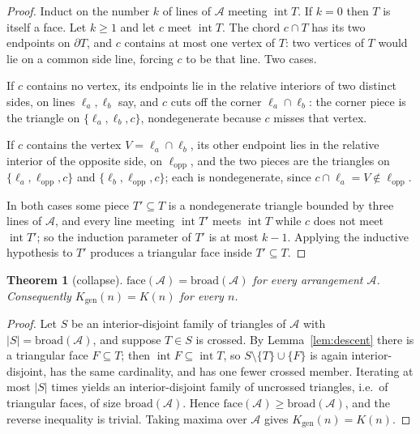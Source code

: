 \documentclass[11pt]{article}
\newtheorem{theorem}{Theorem}
\theoremstyle{definition}
\newcommand{\Kgen}{K_{\mathrm{gen}}}
\newcommand{\intr}{\operatorname{int}}
\begin{document}
\begin{proof}
Induct on the number $k$ of lines of $\mathcal A$ meeting $\intr T$. If
$k=0$ then $T$ is itself a face. Let $k\ge1$ and let $c$ meet $\intr T$.
The chord $c\cap T$ has its two endpoints on $\partial T$, and $c$ contains
at most one vertex of $T$: two vertices of $T$ would lie on a common side
line, forcing $c$ to be that line. Two cases.

If $c$ contains no vertex, its endpoints lie in the relative interiors of two
distinct sides, on lines $\ell_a,\ell_b$ say, and $c$ cuts off the corner
$\ell_a\cap\ell_b$: the corner piece is the triangle on
$\{\ell_a,\ell_b,c\}$, nondegenerate because $c$ misses that vertex.

If $c$ contains the vertex $V=\ell_a\cap\ell_b$, its other endpoint lies in
the relative interior of the opposite side, on $\ell_{\mathrm{opp}}$, and the
two pieces are the triangles on $\{\ell_a,\ell_{\mathrm{opp}},c\}$ and
$\{\ell_b,\ell_{\mathrm{opp}},c\}$; each is nondegenerate, since
$c\cap\ell_a=V\notin\ell_{\mathrm{opp}}$.

In both cases some piece $T'\subseteq T$ is a nondegenerate triangle bounded
by three lines of $\mathcal A$, and every line meeting $\intr T'$ meets
$\intr T$ while $c$ does not meet $\intr T'$; so the induction parameter of
$T'$ is at most $k-1$. Applying the inductive hypothesis to $T'$ produces a
triangular face inside $T'\subseteq T$.
\end{proof}

\begin{theorem}[collapse]\label{thm:collapse}
$\mathrm{face}(\mathcal A)=\mathrm{broad}(\mathcal A)$ for every arrangement
$\mathcal A$. Consequently $\Kgen(n)=K(n)$ for every $n$.
\end{theorem}

\begin{proof}
Let $S$ be an interior-disjoint family of triangles of $\mathcal A$ with
$|S|=\mathrm{broad}(\mathcal A)$, and suppose $T\in S$ is crossed. By
Lemma~\ref{lem:descent} there is a triangular face $F\subseteq T$; then
$\intr F\subseteq\intr T$, so $S\setminus\{T\}\cup\{F\}$ is again
interior-disjoint, has the same cardinality, and has one fewer crossed
member. Iterating at most $|S|$ times yields an interior-disjoint family of
uncrossed triangles, i.e.\ of triangular faces, of size
$\mathrm{broad}(\mathcal A)$. Hence
$\mathrm{face}(\mathcal A)\ge\mathrm{broad}(\mathcal A)$, and the reverse
inequality is trivial. Taking maxima over $\mathcal A$ gives
$\Kgen(n)=K(n)$.
\end{proof}
\end{document}
